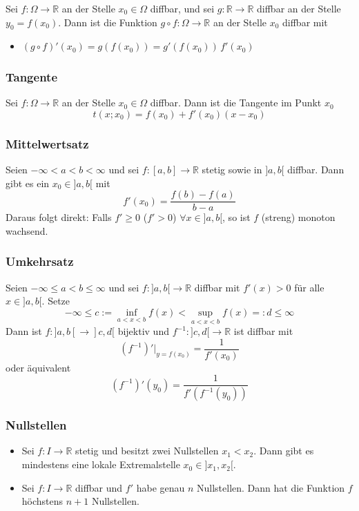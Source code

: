 \documentclass[6pt]{article}
\begin{document}
\begin{multicols*}{3}
		Sei $f: \Omega \to \mathbb{R}$ an der Stelle $x_0 \in \Omega$ diffbar, und sei $g: \mathbb{R} \to \mathbb{R}$ diffbar an der Stelle $y_0 = f(x_0)$.
		Dann ist die Funktion $g \circ f:\Omega \to \mathbb{R}$ an der Stelle $x_0$ diffbar mit
		\begin{itemize}
			\item $(g \circ f)'(x_0) = g(f(x_0)) = g'(f(x_0)) \, f'(x_0)$	
		\end{itemize}
	
	
	\subsubsection*{Tangente}
		Sei $f: \Omega \to \mathbb{R}$ an der Stelle $x_0 \in \Omega$ diffbar. Dann ist die Tangente im Punkt $x_0$
		\[ t(x; x_0)=f(x_0)+f'(x_0)(x-x_0) \]
		
	\subsubsection*{Mittelwertsatz}
		Seien $-\infty < a < b < \infty$ und sei $f:[a,b] \to \mathbb{R}$ stetig sowie in $]a,b[$ diffbar. Dann gibt es ein $x_0 \in ]a,b[$ mit
		\[ f'(x_0)=\frac{f(b)-f(a)}{b-a} \]
		Daraus folgt direkt: Falls $f' \geq 0$ ($f' > 0$) $ \forall x \in ]a,b[$, so ist $f$ (streng) monoton wachsend.

	\subsubsection*{Umkehrsatz}
		Seien $-\infty \leq a < b \leq \infty$ und sei $f:]a,b[ \to \mathbb{R}$ diffbar mit $f'(x) > 0$ f{\"u}r alle $x \in ]a,b[$. Setze
		\[ -\infty \leq c:= \inf_{a < x < b} f(x) < \sup_{a < x < b} f(x) =: d \leq \infty \]
		Dann ist $f: ]a,b[ \to ]c,d[$ bijektiv und $f^{-1} : ]c,d[ \to \mathbb{R}$ ist diffbar mit
		\[ \left( f^{-1} \right)' |_{y = f(x_0)} = \frac{1}{f'(x_0)} \]
		oder {\"a}quivalent
		\[ \left(f^{-1}\right)'(y_0) = \frac{1}{f'(f^{-1}(y_0))} \]
	
	
	\subsubsection*{Nullstellen}
		\begin{itemize}[itemsep=2pt, parsep=3pt]
			\item Sei $f: I \to \mathbb{R}$ stetig und besitzt zwei Nullstellen $x_1 < x_2$. Dann gibt es mindestens eine lokale Extremalstelle $x_0 \in ]x_1,x_2[$.
			\item Sei $f: I \to \mathbb{R}$ diffbar und $f'$ habe genau $n$ Nullstellen. Dann hat die Funktion $f$ h{\"o}chstens $n+1$ Nullstellen.
		\end{itemize}
	

\end{multicols*}
\end{document}
